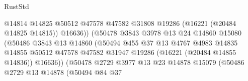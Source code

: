 \begin{lexlean}{RustStd}
\begin{coremodule}
                                              @14814
                                              @14825
                                              @50512
                                              @47578
                                              @47582
                                              @31808
                                              @19286
                                              (@16221 (@20484 @14825 @14815))
                                              @16636))
                                          (@50478
                                            @3843
                                            @3978
                                            @13
                                            @24
                                            @14860
                                            @15080
                                            (@50486
                                              @3843
                                              @13
                                              @14860
                                              (@50494
                                                @455
                                                @37
                                                @13
                                                @4767
                                                @4983
                                                @14835
                                                @14855
                                                @50512
                                                @47578
                                                @47582
                                                @31947
                                                @19286
                                                (@16221 (@20484 @14855 @14836))
                                                @16636))
                                            (@50478
                                              @2729
                                              @3977
                                              @13
                                              @23
                                              @14878
                                              @15079
                                              (@50486
                                                @2729
                                                @13
                                                @14878
                                                (@50494
                                                  @84
                                                  @37

\end{coremodule}
\end{lexlean}
